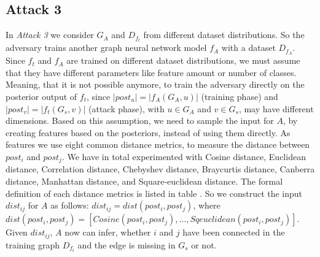     \subsection*{Attack 3}
    \label{section:attack3}
      In \emph{Attack 3} we consider $G_A$ and $D_{f_t}$ from different dataset distributions.
      So the adversary trains another graph neural network model $f_A$ with a dataset $D_{f_A}$.
      Since $f_t$ and $f_A$ are trained on different dataset distributions, we must assume that they have different parameters like feature amount or number of classes. 
      Meaning, that it is not possible anymore, to train the adversary directly on the posterior output of $f_t$, since $|post_u| = |f_A(G_A,u)|$ (training phase) and $|post_v| = |f_t(G_s,v)|$ (attack phase), with $u \in G_A$ and $v \in G_s$, may have different dimensions.
      Based on this assumption, we need to sample the input for $A$, by creating features based on the posteriors, instead of using them directly.
      As features we use eight common distance metrics, to measure the distance between $post_i$ and $post_j$.
      We have in total experimented with Cosine distance, Euclidean distance, Correlation distance, Chebyshev distance, Braycurtis distance, Canberra distance, Manhattan distance, and Square-euclidean distance.
      The formal definition of each distance metrics is listed in table .
      So we construct the input $dist_{ij}$ for $A$ as follows: $dist_{ij} = dist(post_i, post_j)$, where $dist(post_i, post_j) = [Cosine(post_i,post_j), ..., Sqeuclidean(post_i,post_j)]$.
      Given $dist_{ij}$, $A$ now can infer, whether $i$ and $j$ have been connected in the training graph $D_{f_t}$ and the edge is missing in $G_s$ or not.

